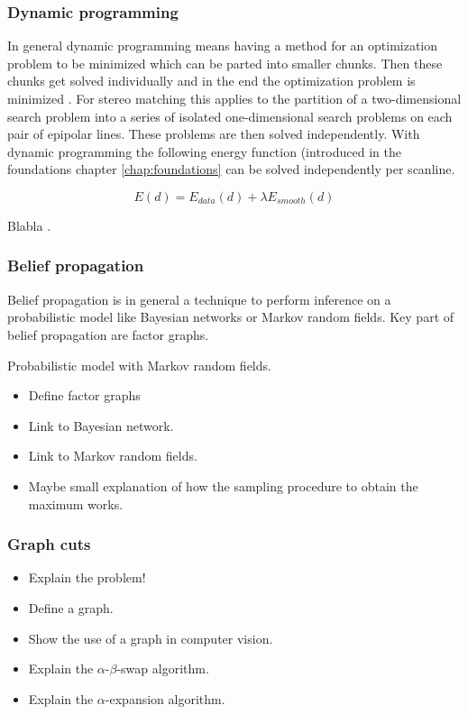 \subsubsection{Dynamic programming}

In general dynamic programming means having a method for an optimization problem to be minimized which can be parted into smaller chunks.
Then these chunks get solved individually and in the end the optimization problem is minimized \citep{angel1972dynamic, bellman2015applied}.
For stereo matching this applies to the partition of a two-dimensional search problem into a series of isolated one-dimensional search problems on each pair of epipolar lines.
These problems are then solved independently.
With dynamic programming the following energy function (introduced in the foundations chapter \ref{chap:foundations} can be solved independently per scanline.

\begin{equation}
  E(d) = E_{data}(d) + \lambda E_{smooth}(d)
\end{equation}

Blabla \citep{cyganek2011introduction}.

\subsubsection{Belief propagation}

Belief propagation is in general a technique to perform inference on a probabilistic model like Bayesian networks or Markov random fields.
Key part of belief propagation are factor graphs.

Probabilistic model with Markov random fields. \citep{yedidia2003understanding}

\begin{itemize}
  \item Define factor graphs
  \item Link to Bayesian network.
  \item Link to Markov random fields.
  \item Maybe small explanation of how the sampling procedure to obtain the maximum works.
\end{itemize}

\subsubsection{Graph cuts}

\begin{itemize}
  \item Explain the problem! \citep{boykov2001fast}
  \item Define a graph.
  \item Show the use of a graph in computer vision.
  \item Explain the $\alpha$-$\beta$-swap algorithm.
  \item Explain the $\alpha$-expansion algorithm.
\end{itemize}

